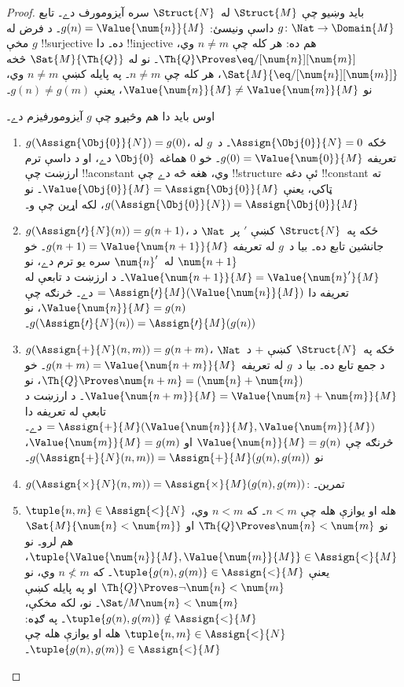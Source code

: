 \documentclass[../../../include/open-logic-section]{subfiles}
\begin{document}
\begin{proof}
بايد وښيو چې $\Struct{M}$ له~$\Struct{N}$ سره آيزومورف دے۔ تابع
$g\colon \Nat \to \Domain{M}$ داسې ونيسئ: $g(n) =
\Value{\num{n}}{M}$۔ د فرض له مخې $g$ !!{surjective} ده۔ دا
!!{injective} هم ده: هر کله چې $n \neq m$ وي، $\Th{Q} \Proves
\eq/[\num{n}][\num{m}]$۔ نو له $\Sat{M}{\Th{Q}}$ څخه
$\Sat{M}{\eq/[\num{n}][\num{m}]}$، هر کله چې $n \neq m$۔ په پايله
کښې $n \neq m$ وي، نو $\Value{\num{n}}{M} \neq
\Value{\num{m}}{M}$، يعنې $g(n) \neq g(m)$۔

اوس بايد دا هم وڅېړو چې $g$ آيزومورفيزم دے۔
\begin{enumerate}
\item $g(\Assign{\Obj{0}}{N}) = g(0)$، ځکه $\Assign{\Obj{0}}{N} = 0$۔
  د~$g$ له تعريفه $g(0) = \Value{\num{0}}{M}$۔ خو $\num{0}$ هماغه
  $\Obj{0}$ دے، او د داسې ترم ارزښت چې !!a{constant} وي، هغه څه دے
  چې !!{structure} ئې دغه !!{constant} ته ټاکي، يعنې $\Value{\Obj{0}}{M} =
  \Assign{\Obj{0}}{M}$۔ نو $g(\Assign{\Obj{0}}{N}) =
  \Assign{\Obj{0}}{M}$، لکه اړين چې و۔
\item $g(\Assign{\prime}{N}(n)) = g(n+1)$، ځکه په~$\Struct{N}$ کښې
  $\prime$ پر~$\Nat$ د جانشين تابع ده۔ بيا د~$g$ له تعريفه
  $g(n+1) = \Value{\num{n+1}}{M}$۔ خو $\num{n+1}$ له~$\num{n}'$
  سره يو ترم دے، نو $\Value{\num{n+1}}{M} =
  \Value{\num{n}'}{M}$۔ د ارزښت د تابعې له تعريفه دا
  $= \Assign{\prime}{M}(\Value{\num{n}}{M})$ دے۔ څرنګه چې
  $\Value{\num{n}}{M} = g(n)$، نو
  $g(\Assign{\prime}{N}(n)) = \Assign{\prime}{M}(g(n))$۔
\item $g(\Assign{+}{N}(n,m)) = g(n+m)$، ځکه په~$\Struct{N}$ کښې $+$
  د~$\Nat$ د جمع تابع ده۔ بيا د~$g$ له تعريفه
$g(n+m) = \Value{\num{n+m}}{M}$۔
  خو $\Th{Q} \Proves \num{n+m} = (\num{n} + \num{m})$، نو
  $\Value{\num{n+m}}{M} = \Value{\num{n}+\num{m}}{M}$۔ د ارزښت د
  تابعې له تعريفه دا
  $= \Assign{+}{M}(\Value{\num{n}}{M},\Value{\num{m}}{M})$ دے۔
  څرنګه چې $\Value{\num{n}}{M} = g(n)$ او
  $\Value{\num{m}}{M} = g(m)$، نو
  $g(\Assign{+}{N}(n, m)) = \Assign{+}{M}(g(n), g(m))$۔
\item $g(\Assign{\times}{N}(n, m)) = \Assign{\times}{M}(g(n), g(m))$:
  تمرين۔
\item $\tuple{n,m} \in \Assign{<}{N}$ هله او يوازې هله چې $n < m$۔
  که $n < m$ وي، نو $\Th{Q} \Proves \num{n} < \num{m}$ او
  $\Sat{M}{\num{n} < \num{m}}$ هم لرو۔ نو
  $\tuple{\Value{\num{n}}{M}, \Value{\num{m}}{M}} \in
  \Assign{<}{M}$، يعنې $\tuple{g(n), g(m)} \in \Assign{<}{M}$۔
  که $n \not< m$ وي، نو $\Th{Q} \Proves \lnot \num{n} < \num{m}$ او
  په پايله کښې $\Sat/{M}{\num{n} < \num{m}}$۔ نو، لکه مخکې،
  $\tuple{g(n), g(m)} \notin \Assign{<}{M}$۔ په ګډه:
  $\tuple{n,m} \in \Assign{<}{N}$ هله او يوازې هله چې
  $\tuple{g(n), g(m)} \in \Assign{<}{M}$۔
\end{enumerate}
\end{proof}
\end{document}
